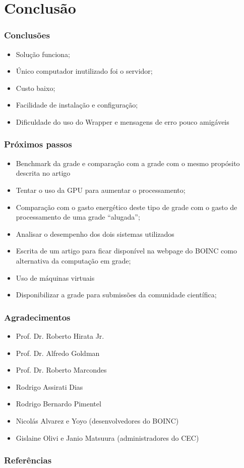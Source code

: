 \documentclass{beamer}
\begin{document}
\section{Conclusão}

\begin{frame}
  \frametitle{Conclusões}
  \begin{itemize}
    \item Solução funciona;
    \item Único computador inutilizado foi o servidor;
    \item Custo baixo;
    \item Facilidade de instalação e configuração;
    \item Dificuldade do uso do Wrapper e mensagens de erro pouco amigáveis 
  \end{itemize}
\end{frame}

\begin{frame}
  \frametitle{Próximos passos}
  \begin{itemize}
    \item Benchmark da grade e comparação com a grade com o mesmo propósito descrita no artigo \cite{Dias}
    \item Tentar o uso da GPU para aumentar o processamento;
    \item Comparação com o gasto energético deste tipo de grade com o gasto de processamento de uma grade ``alugada'';
    \item Analisar o desempenho dos dois sistemas utilizados
    \item Escrita de um artigo para ficar disponível na webpage do BOINC como alternativa da computação em grade;
    \item Uso de máquinas virtuais 
    \item Disponibilizar a grade para submissões da comunidade científica;
  \end{itemize}
\end{frame}



\begin{frame}
  \frametitle{Agradecimentos}
  \begin{itemize}
    \item Prof. Dr. Roberto Hirata Jr.
    \item Prof. Dr. Alfredo Goldman
    \item Prof. Dr. Roberto Marcondes
    \item Rodrigo Assirati Dias
    \item Rodrigo Bernardo Pimentel
    \item Nicolás Alvarez e Yoyo (desenvolvedores do BOINC)
    \item Gislaine Olivi e Janio Matsuura (administradores do CEC)
  \end{itemize}
\end{frame}

\begin{frame}
  \frametitle{Referências}
  
  
\end{frame}
\end{document}
